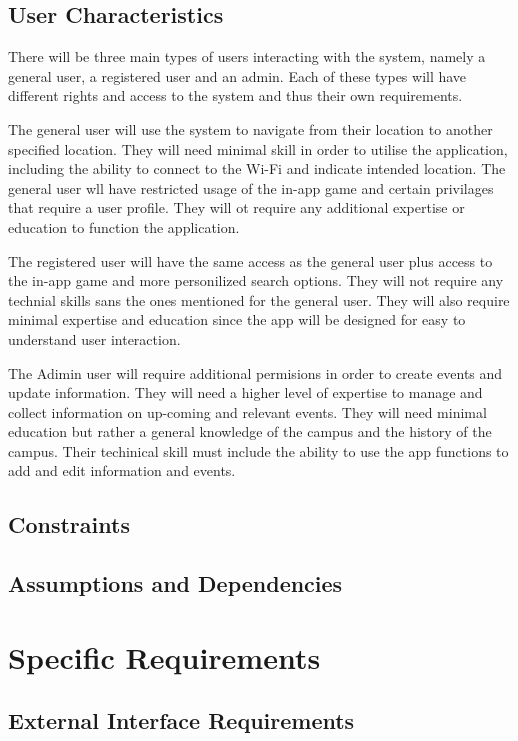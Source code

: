 \documentclass{article}
\begin{document}
    	\subsection{User Characteristics}  
		

There will be three main types of users interacting with the system, namely a general user, a registered user and an admin. Each of these types will have different rights and access to the system and thus their own requirements.

The general user will use the system to navigate from their location to another specified location. They will need minimal skill in order to utilise the application, including the ability to connect to the Wi-Fi and indicate intended location. The general user wll have restricted usage of the in-app game and certain privilages that require a user profile. They will ot require any additional expertise or education to function the application.

The registered user will have the same access as the general user plus access to the in-app game and more personilized search options. They will not require any technial skills sans the ones mentioned for the general user. They will also require minimal expertise and education since the app will be designed for easy to understand user interaction.

The Adimin user will require additional permisions in order to create events and update information. They will need a higher level of expertise to manage and collect information on up-coming and relevant events. They will need minimal education but rather a general knowledge of the campus and the history of the campus. Their techinical skill must include the ability to use the app functions to add and edit information and events.

	 
    	\subsection{Constraints}   
    	\subsection{Assumptions and Dependencies}

	\section{Specific Requirements}
    
    	\subsection{External Interface Requirements}
\end{document}
